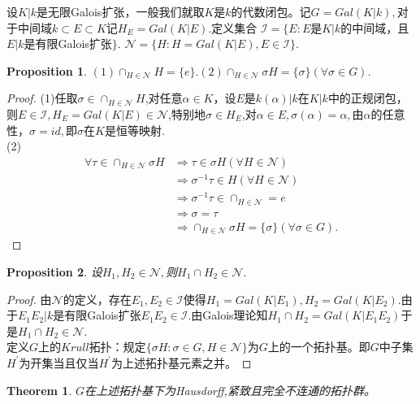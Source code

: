 \documentclass[UTF8]{article}
\newtheorem{thm}{Theorem}[section]
\newtheorem{prop}{Proposition}[section]
\begin{document}
设$K|k$是无限Galois扩张，一般我们就取$K$是$k$的代数闭包。记$G=Gal(K|k),$对于中间域$k\subset E\subset K$记$H_{E}=Gal(K|E).$定义集合
$\mathcal{I}=\{E:E$是$K|k$的中间域，且$E|k$是有限Galois扩张$\}$.
$\mathcal{N}=\{H:H=Gal(K|E),E\in \mathcal{I}\}$.\\
\begin{prop}
$(1)\cap_{H\in\mathcal{N}}H=\{e\}.(2)\cap_{H\in \mathcal{N}}\sigma H=\{\sigma\}(\forall \sigma \in G)$.
\end{prop}
\begin{proof}
(1)任取$\sigma \in \cap_{H\in\mathcal{N}}H$,对任意$\alpha\in K$，设$E$是$k(\alpha)|k$在$K|k$中的正规闭包，则$E\in \mathcal{I},H_{E}=Gal(K|E)\in \mathcal{N}$,特别地$\sigma \in H_{E}$,对$\alpha \in E,\sigma(\alpha)=\alpha,$由$\alpha$的任意性，$\sigma=id,$即$\sigma $在$K$是恒等映射.\\
(2)\[
\begin{split}
\forall \tau\in \cap_{H\in \mathcal{N}}\sigma H&\Rightarrow\tau\in \sigma H(\forall H\in \mathcal{N})\\
&\Rightarrow \sigma^{-1}\tau\in H(\forall H\in \mathcal{N})\\
&\Rightarrow \sigma^{-1}\tau\in \cap_{H\in\mathcal{N}}={e}\\
&\Rightarrow \sigma=\tau\\
&\Rightarrow \cap_{H\in \mathcal{N}}\sigma H=\{\sigma\}(\forall \sigma \in G).
\end{split}
\]
\end{proof}
\begin{prop}
设$H_{1},H_{2}\in \mathcal{N},$则$H_{1}\cap H_{2}\in \mathcal{N}.$
\end{prop}
\begin{proof}
由$\mathcal{N}$的定义，存在$E_{1},E_{2}\in \mathcal{I}$使得$H_{1}=Gal(K|E_{1}),H_{2}=Gal(K|E_{2}).$由于$E_{1}E_{2}|k$是有限Galois扩张$E_{1}E_{2}\in \mathcal{I}.$由Galois理论知$H_{1}\cap H_{2}=Gal(K|E_{1}E_{2})$于是$H_{1}\cap H_{2}\in \mathcal{N}.$\\
定义$G$上的$Krull$拓扑：规定$\{\sigma H:\sigma \in G,H\in \mathcal{N}\}$为$G$上的一个拓扑基。即$G$中子集$H^{'}$为开集当且仅当$H^{'}$为上述拓扑基元素之并。
\end{proof} 
\begin{thm}
$G$在上述拓扑基下为Hausdorff,紧致且完全不连通的拓扑群。
\end{thm}
\end{document}
